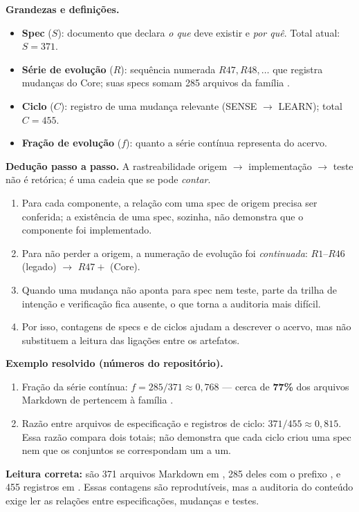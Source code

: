 \begin{definicao}
\textbf{Grandezas e definições.}
\begin{itemize}[leftmargin=1.3em,itemsep=1pt]
  \item \textbf{Spec} ($S$): documento que declara \emph{o que} deve existir e \emph{por quê}. Total atual: $S = 371$.
  \item \textbf{Série de evolução} ($R$): sequência numerada $R47, R48, \dots$ que registra mudanças do Core; suas specs somam 285 arquivos da família .
  \item \textbf{Ciclo} ($C$): registro de uma mudança relevante (SENSE $\to$ LEARN); total $C = 455$.
  \item \textbf{Fração de evolução} ($f$): quanto a série contínua representa do acervo.
\end{itemize}
\end{definicao}

\begin{metodo}
\textbf{Dedução passo a passo.} A rastreabilidade origem $\to$ implementação $\to$
teste não é retórica; é uma cadeia que se pode \emph{contar}.
\begin{enumerate}[leftmargin=1.4em,itemsep=2pt]
  \item Para cada componente, a relação com uma spec de origem precisa ser conferida; a existência de uma spec, sozinha, não demonstra que o componente foi implementado.
  \item Para não perder a origem, a numeração de evolução foi \emph{continuada}: $R1$--$R46$ (legado) $\to$ $R47+$ (Core).
  \item Quando uma mudança não aponta para spec nem teste, parte da trilha de intenção e verificação fica ausente, o que torna a auditoria mais difícil.
  \item Por isso, contagens de specs e de ciclos ajudam a descrever o acervo, mas não substituem a leitura das ligações entre os artefatos.
\end{enumerate}
\end{metodo}

\begin{resultado}
\textbf{Exemplo resolvido (números do repositório).}
\begin{enumerate}[leftmargin=1.4em,itemsep=1pt]
  \item Fração da série contínua: $f = 285/371 \approx 0{,}768$ --- cerca de \textbf{77\%} dos arquivos Markdown de  pertencem à família .
  \item Razão entre arquivos de especificação e registros de ciclo: $371/455 \approx 0{,}815$. Essa razão compara dois totais; não demonstra que cada ciclo criou uma spec nem que os conjuntos se correspondam um a um.
\end{enumerate}
\textbf{Leitura correta:} são 371 arquivos Markdown em , 285 deles
com o prefixo , e 455 registros em .
Essas contagens são reprodutíveis, mas a auditoria do conteúdo exige ler as
relações entre especificações, mudanças e testes.
\end{resultado}

